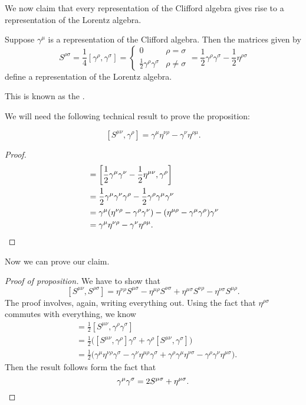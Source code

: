 \documentclass[a4paper]{article}
\begin{document}
We now claim that every representation of the Clifford algebra gives rise to a representation of the Lorentz algebra.

\begin{prop}
  Suppose $\gamma^\mu$ is a representation of the Clifford algebra. Then the matrices given by
  \[
    S^{\rho\sigma} = \frac{1}{4}[\gamma^\rho, \gamma^\sigma] =
    \begin{cases}
      0 & \rho = \sigma\\
      \frac{1}{2}\gamma^\rho \gamma^\sigma & \rho \not= \sigma
    \end{cases}
    = \frac{1}{2} \gamma^\rho \gamma^\sigma - \frac{1}{2}\eta^{\rho\sigma}
  \]
  define a representation of the Lorentz algebra.
\end{prop}
This is known as the .

We will need the following technical result to prove the proposition:
\begin{lemma}
  \[
    [S^{\mu\nu}, \gamma^\rho] = \gamma^\mu \eta^{\nu\rho} - \gamma^\nu \eta^{\rho\mu}.
  \]
\end{lemma}

\begin{proof}
  \begin{align*}
    [S^{\mu\nu}, \gamma^\rho] &= \left[\frac{1}{2} \gamma^\mu\gamma^\nu - \frac{1}{2}\eta^{\mu\nu}, \gamma^\rho\right]\\
    &= \frac{1}{2} \gamma^\mu \gamma^\nu \gamma^\rho - \frac{1}{2} \gamma^\rho \gamma^\mu \gamma^\nu\\
    &= \gamma^\mu (\eta^{\nu\rho} - \gamma^\rho \gamma^\nu) - (\eta^{\mu\rho} - \gamma^\mu \gamma^\rho)\gamma^\nu\\
    &= \gamma^\mu \eta^{\nu\rho} - \gamma^\nu \eta^{\rho\mu}. \qedhere
  \end{align*}
\end{proof}

Now we can prove our claim.

\begin{proof}[Proof of proposition]
  We have to show that
  \[
    [S^{\mu\nu}, S^{\rho\sigma}] = \eta^{\nu\rho} S^{\mu\sigma} - \eta^{\mu\rho} S^{\nu\sigma} + \eta^{\mu\sigma} S^{\nu\rho} - \eta^{\nu\sigma} S^{\mu\rho}.
  \]
  The proof involves, again, writing everything out. Using the fact that $\eta^{\rho\sigma}$ commutes with everything, we know
  \begin{align*}
    [S^{\mu\nu}, S^{\rho\sigma}] &= \frac{1}{2}[S^{\mu\nu}, \gamma^\rho \gamma^\sigma]\\
    &= \frac{1}{2}\big([S^{\mu\nu}, \gamma^\rho] \gamma^\sigma + \gamma^\rho[S^{\mu\nu}, \gamma^\sigma]\big)\\
    &= \frac{1}{2}\big(\gamma^\mu \eta^{\nu \rho} \gamma^\sigma - \gamma^\nu \eta^{\mu\rho} \gamma^\sigma + \gamma^\rho \gamma^\mu \eta^{\nu\sigma} - \gamma^\rho \gamma^\nu \eta^{\mu\sigma}\big).
  \end{align*}
  Then the result follows form the fact that
  \[
    \gamma^\mu \gamma^\sigma = 2 S^{\mu\sigma} + \eta^{\mu\sigma}. \qedhere
  \]
\end{proof}
\end{document}
